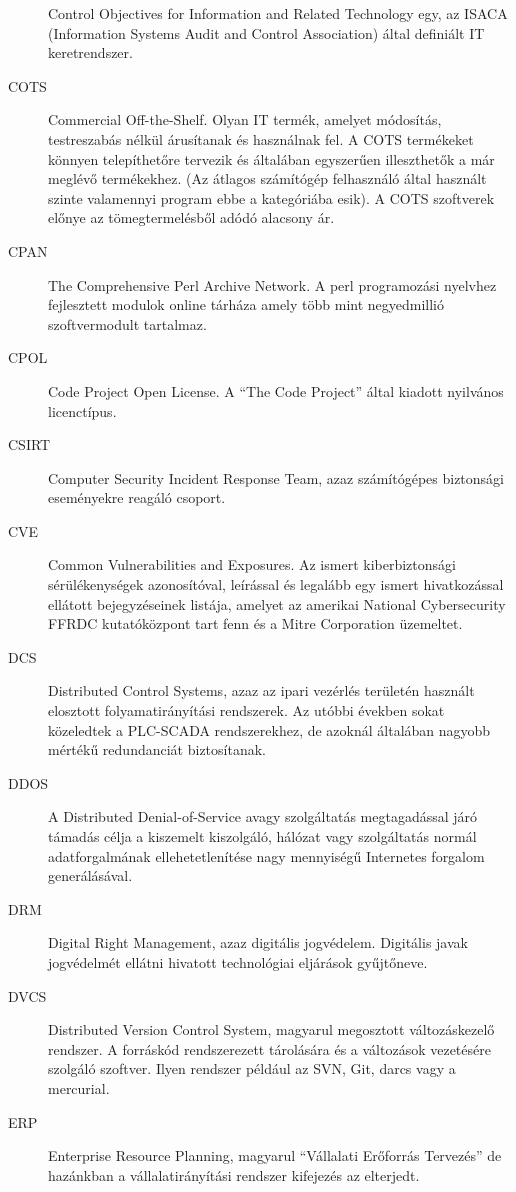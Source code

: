 \documentclass[12pt,magyar,a4paper,oneside]{scrreprt}
\begin{document}
\begin{description}
Control Objectives for Information and Related Technology egy, az ISACA
(Information Systems Audit and Control Association) által definiált IT
keretrendszer.
\item[COTS]
Commercial Off-the-Shelf. Olyan IT termék, amelyet módosítás,
testreszabás nélkül árusítanak és használnak fel. A COTS termékeket
könnyen telepíthetőre tervezik és általában egyszerűen illeszthetők a
már meglévő termékekhez. (Az átlagos számítógép felhasználó által
használt szinte valamennyi program ebbe a kategóriába esik). A COTS
szoftverek előnye az tömegtermelésből adódó alacsony ár.
\item[CPAN]
The Comprehensive Perl Archive Network. A perl programozási nyelvhez
fejlesztett modulok online tárháza amely több mint negyedmillió
szoftvermodult tartalmaz.
\item[CPOL]
Code Project Open License. A ``The Code Project'' által kiadott
nyilvános licenctípus.
\item[CSIRT]
Computer Security Incident Response Team, azaz számítógépes biztonsági
eseményekre reagáló csoport.
\item[CVE]
Common Vulnerabilities and Exposures. Az ismert kiberbiztonsági
sérülékenységek azonosítóval, leírással és legalább egy ismert
hivatkozással ellátott bejegyzéseinek listája, amelyet az amerikai
National Cybersecurity FFRDC kutatóközpont tart fenn és a Mitre
Corporation üzemeltet.
\item[DCS]
Distributed Control Systems, azaz az ipari vezérlés területén használt
elosztott folyamatirányítási rendszerek. Az utóbbi években sokat
közeledtek a PLC-SCADA rendszerekhez, de azoknál általában nagyobb
mértékű redundanciát biztosítanak.
\item[DDOS]
A Distributed Denial-of-Service avagy szolgáltatás megtagadással járó
támadás célja a kiszemelt kiszolgáló, hálózat vagy szolgáltatás normál
adatforgalmának ellehetetlenítése nagy mennyiségű Internetes forgalom
generálásával.
\item[DRM]
Digital Right Management, azaz digitális jogvédelem. Digitális javak
jogvédelmét ellátni hivatott technológiai eljárások gyűjtőneve.
\item[DVCS]
Distributed Version Control System, magyarul megosztott változáskezelő
rendszer. A forráskód rendszerezett tárolására és a változások
vezetésére szolgáló szoftver. Ilyen rendszer például az SVN, Git, darcs
vagy a mercurial.
\item[ERP]
Enterprise Resource Planning, magyarul ``Vállalati Erőforrás Tervezés''
de hazánkban a vállalatirányítási rendszer kifejezés az elterjedt.

\end{description}
\end{document}

